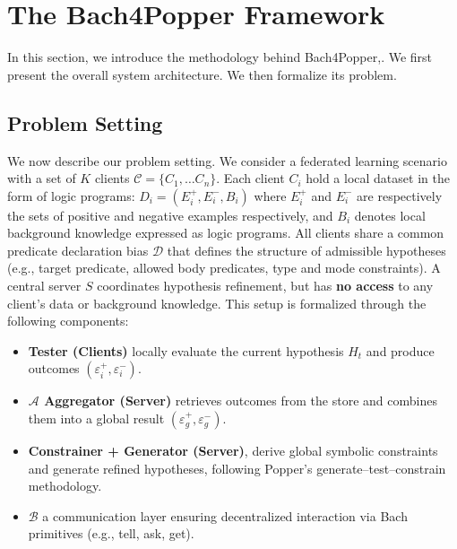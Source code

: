 \section{The Bach4Popper Framework}
In this section, we introduce the methodology behind Bach4Popper,. 
We first present the overall system architecture. We then formalize its problem. 


\subsection{Problem Setting}
We now describe our problem setting. We consider a federated learning scenario with a set of $K$ clients $\mathcal{C} = \{C_1, \ldots C_n\}$. 
Each client $C_i$ hold a local dataset in the form of logic programs: $ D_i = (E_i^+,E_i^-, B_i)$ where $E_i^+$ and $E_i^-$ are respectively the sets of positive and negative examples respectively, and $B_i$ denotes local background knowledge expressed as logic programs. %
All clients share a common predicate declaration bias $\mathcal{D}$ that defines the structure of admissible hypotheses (e.g., target predicate, allowed body predicates, type and mode constraints). A central server $S$ coordinates hypothesis refinement, but has \textbf{no access} to any client’s data or background knowledge. This setup is formalized through the following components:
\begin{itemize}
    \item \textbf{Tester (Clients)} locally evaluate the current hypothesis $H_t$
    and produce outcomes $(\varepsilon_i^+, \varepsilon_i^-)$.
    \item \textbf{ $\mathcal{A}$ Aggregator (Server)} retrieves outcomes from the store and  combines them into a global result $(\varepsilon_g^+, \varepsilon_g^-)$.
    \item \textbf{Constrainer + Generator (Server)}, derive global symbolic constraints and generate refined hypotheses, following Popper’s generate–test–constrain methodology.
    \item $\mathcal{B}$ a communication layer ensuring decentralized interaction via Bach primitives (e.g., tell, ask, get).
\end{itemize}



